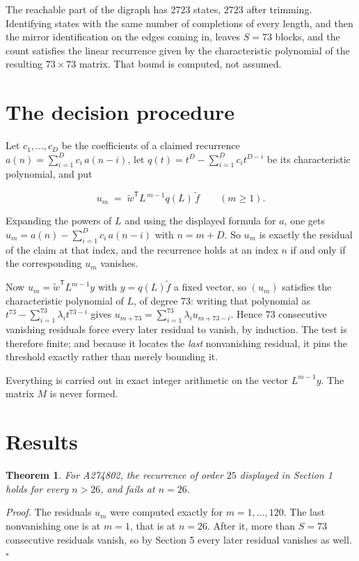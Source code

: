 \documentclass[11pt]{article}
\newtheorem{theorem}{Theorem}
\theoremstyle{definition}
\begin{document}
The reachable part of the digraph has $2723$ states, $2723$ after trimming. Identifying states with the same number of completions of every length, and then the mirror identification on the edges coming in, leaves $S = 73$ blocks, and the count satisfies the linear recurrence given by the characteristic polynomial of the resulting $73\times73$ matrix. That bound is computed, not assumed.

\section{The decision procedure}

Let $c_1,\dots,c_D$ be the coefficients of a claimed recurrence $a(n) = \sum_{i=1}^{D} c_i\,a(n-i)$, let $q(t) = t^{D} - \sum_{i=1}^{D} c_i t^{D-i}$ be its characteristic polynomial, and put

\[u_m \;=\; \tilde w^{\mathsf T} L^{\,m-1} q(L)\,\tilde f \qquad (m \ge 1).\]

Expanding the powers of $L$ and using the displayed formula for $a$, one gets $u_m = a(n) - \sum_{i=1}^{D} c_i\,a(n-i)$ with $n = m + D$. So $u_m$ is exactly the residual of the claim at that index, and the recurrence holds at an index $n$ if and only if the corresponding $u_m$ vanishes.

Now $u_m = \tilde w^{\mathsf T} L^{m-1} y$ with $y = q(L)\tilde f$ a fixed vector, so $(u_m)$ satisfies the characteristic polynomial of $L$, of degree $73$: writing that polynomial as $t^{73} - \sum_{i=1}^{73} \lambda_i t^{73-i}$ gives $u_{m+73} = \sum_{i=1}^{73} \lambda_i u_{m+73-i}$. Hence $73$ consecutive vanishing residuals force every later residual to vanish, by induction. The test is therefore finite; and because it locates the {\itshape last} nonvanishing residual, it pins the threshold exactly rather than merely bounding it.

Everything is carried out in exact integer arithmetic on the vector $L^{m-1}y$. The matrix $M$ is never formed.

\section{Results}

\begin{theorem} For A274802, the recurrence of order $25$ displayed in Section 1 holds for every $n > 26$, and fails at $n = 26$.\end{theorem}

{\itshape Proof.} The residuals $u_m$ were computed exactly for $m = 1,\dots,120$. The last nonvanishing one is at $m = 1$, that is at $n = 26$. After it, more than $S = 73$ consecutive residuals vanish, so by Section 5 every later residual vanishes as well. $\square$
\end{document}
